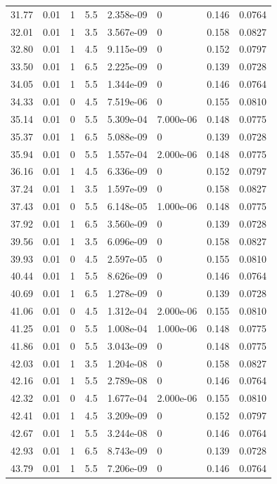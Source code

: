 \documentclass[preview]{standalone}
\begin{document}
{{{\begin{tabular}{L{1.2cm}C{1.2cm} C{0.3cm}C{0.5cm} C{1.4cm}C{1.4cm} C{1.4cm}C{1.4cm}}
  31.77  &  0.01  & 1     & 5.5 &  2.358e-09  & 0  & 0.146 &  0.0764   \\ 
  32.01  &  0.01  & 1     & 3.5 &  3.567e-09  & 0  & 0.158 &  0.0827   \\ 
  32.80  &  0.01  & 1     & 4.5 &  9.115e-09  & 0  & 0.152 &  0.0797   \\ 
  33.50  &  0.01  & 1     & 6.5 &  2.225e-09  & 0  & 0.139 &  0.0728   \\ 
  34.05  &  0.01  & 1     & 5.5 &  1.344e-09  & 0  & 0.146 &  0.0764   \\ 
  34.33  &  0.01  & 0     & 4.5 &  7.519e-06  & 0  & 0.155 &  0.0810   \\ 
  35.14  &  0.01  & 0     & 5.5 &  5.309e-04  & 7.000e-06  & 0.148 &  0.0775   \\ 
  35.37  &  0.01  & 1     & 6.5 &  5.088e-09  & 0  & 0.139 &  0.0728   \\ 
  35.94  &  0.01  & 0     & 5.5 &  1.557e-04  & 2.000e-06  & 0.148 &  0.0775   \\ 
  36.16  &  0.01  & 1     & 4.5 &  6.336e-09  & 0  & 0.152 &  0.0797   \\ 
  37.24  &  0.01  & 1     & 3.5 &  1.597e-09  & 0  & 0.158 &  0.0827   \\ 
  37.43  &  0.01  & 0     & 5.5 &  6.148e-05  & 1.000e-06  & 0.148 &  0.0775   \\ 
  37.92  &  0.01  & 1     & 6.5 &  3.560e-09  & 0  & 0.139 &  0.0728   \\ 
  39.56  &  0.01  & 1     & 3.5 &  6.096e-09  & 0  & 0.158 &  0.0827   \\ 
  39.93  &  0.01  & 0     & 4.5 &  2.597e-05  & 0  & 0.155 &  0.0810   \\ 
  40.44  &  0.01  & 1     & 5.5 &  8.626e-09  & 0  & 0.146 &  0.0764   \\ 
  40.69  &  0.01  & 1     & 6.5 &  1.278e-09  & 0  & 0.139 &  0.0728   \\ 
  41.06  &  0.01  & 0     & 4.5 &  1.312e-04  & 2.000e-06  & 0.155 &  0.0810   \\ 
  41.25  &  0.01  & 0     & 5.5 &  1.008e-04  & 1.000e-06  & 0.148 &  0.0775   \\ 
  41.86  &  0.01  & 0     & 5.5 &  3.043e-09  & 0  & 0.148 &  0.0775   \\ 
  42.03  &  0.01  & 1     & 3.5 &  1.204e-08  & 0  & 0.158 &  0.0827   \\ 
  42.16  &  0.01  & 1     & 5.5 &  2.789e-08  & 0  & 0.146 &  0.0764   \\ 
  42.32  &  0.01  & 0     & 4.5 &  1.677e-04  & 2.000e-06  & 0.155 &  0.0810   \\ 
  42.41  &  0.01  & 1     & 4.5 &  3.209e-09  & 0  & 0.152 &  0.0797   \\ 
  42.67  &  0.01  & 1     & 5.5 &  3.244e-08  & 0  & 0.146 &  0.0764   \\ 
  42.93  &  0.01  & 1     & 6.5 &  8.743e-09  & 0  & 0.139 &  0.0728   \\ 
  43.79  &  0.01  & 1     & 5.5 &  7.206e-09  & 0  & 0.146 &  0.0764   \\ 
\hline 
\end{tabular} 

}}}
\end{document}
